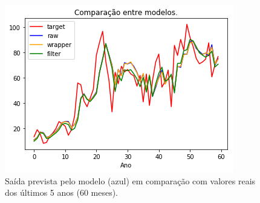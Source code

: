 \documentclass[a4paper, 12pt]{article}
\begin{document}
\begin{figure}[h!]
  \includegraphics{images/comparison.png}
    \caption{Saída prevista pelo modelo (azul) em comparação com valores reais dos últimos 5 anos (60 meses).}
\end{figure}
\end{document}
